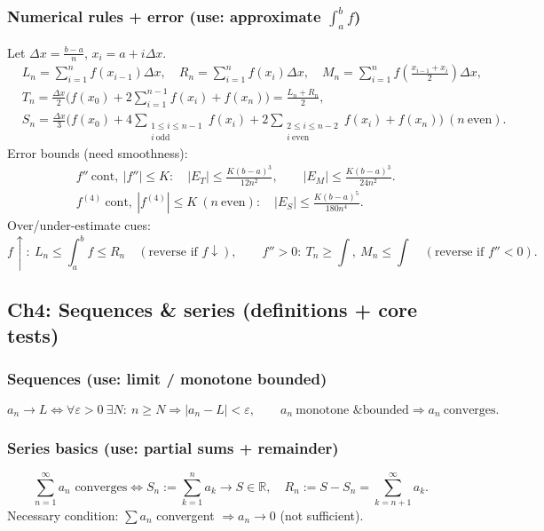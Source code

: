 \documentclass[12pt]{article}
\begin{document}
\subsubsection{Numerical rules + error (use: approximate $\int_a^b f$)}
Let $\Delta x=\frac{b-a}{n}$, $x_i=a+i\Delta x$.
\begin{align*}
&L_n=\sum_{i=1}^n f(x_{i-1})\Delta x,\quad
R_n=\sum_{i=1}^n f(x_i)\Delta x,\quad
M_n=\sum_{i=1}^n f\!\left(\frac{x_{i-1}+x_i}{2}\right)\Delta x,\\
&T_n=\frac{\Delta x}{2}\Big(f(x_0)+2\sum_{i=1}^{n-1}f(x_i)+f(x_n)\Big)=\frac{L_n+R_n}{2},\\
&S_n=\frac{\Delta x}{3}\Big(f(x_0)+4\!\!\sum_{\substack{1\le i\le n-1\\ i\ \text{odd}}}\!\!f(x_i)+2\!\!\sum_{\substack{2\le i\le n-2\\ i\ \text{even}}}\!\!f(x_i)+f(x_n)\Big)\ (n\ \text{even}).
\end{align*}
Error bounds (need smoothness):
\begin{align*}
&f''\ \text{cont},\ |f''|\le K:\quad |E_T|\le \frac{K(b-a)^3}{12n^2},\qquad |E_M|\le \frac{K(b-a)^3}{24n^2}.\\
&f^{(4)}\ \text{cont},\ |f^{(4)}|\le K\ (n\ \text{even}):\quad |E_S|\le \frac{K(b-a)^5}{180n^4}.
\end{align*}
Over/under-estimate cues:
\[
f\uparrow:\ L_n\le \int_a^b f\le R_n\quad(\text{reverse if }f\downarrow),\qquad
f''>0:\ T_n\ge \int,\ M_n\le \int\quad(\text{reverse if }f''<0).
\]

\subsection{Ch4: Sequences \& series (definitions + core tests)}
\subsubsection{Sequences (use: limit / monotone bounded)}
\[
a_n\to L\iff \forall\varepsilon>0\ \exists N:\ n\ge N\Rightarrow |a_n-L|<\varepsilon,\qquad
a_n\ \text{monotone \& bounded}\Rightarrow a_n\ \text{converges}.
\]

\subsubsection{Series basics (use: partial sums + remainder)}
\[
\sum_{n=1}^{\infty}a_n \text{ converges} \iff S_n := \sum_{k=1}^n a_k \to S \in \mathbb{R}, \quad
R_n := S - S_n = \sum_{k=n+1}^{\infty} a_k.
\]
Necessary condition: $\sum a_n$ convergent $\Rightarrow a_n\to 0$ (not sufficient).
\end{document}
